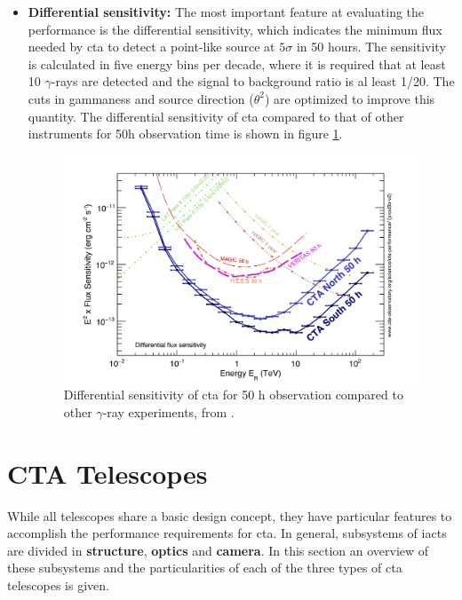 \documentclass[main.tex]{subfiles}
\begin{document}
\begin{itemize}
\item \textbf{Differential sensitivity:} The most important feature at evaluating the performance is the differential sensitivity, which indicates the minimum flux needed by \gls{cta} to detect a point-like source at $5\sigma$ in 50 hours. The sensitivity is calculated in five energy bins per decade, where it is required that at least 10 $\gamma$-rays are detected and the signal to background ratio is al least 1/20. The cuts in gammaness and source direction ($\theta^2$) are optimized to improve this quantity. The differential sensitivity of \gls{cta} compared to that of other instruments for 50h observation time is shown in figure \ref{fig:ctaperformance}.\\

\begin{figure}[h]
    \centering
    \includegraphics[width=1\textwidth]{Pictures/CTA-Performance-prod3b-v2-Comparison-DifferentialSensitivity-OtherInstruments.pdf}
    \caption{Differential sensitivity of \gls{cta} for 50 h observation compared to other $\gamma$-ray experiments, from \cite{CTAPerformance}.}
    \label{fig:ctaperformance}
\end{figure}
  
\end{itemize}

\section{CTA Telescopes} \label{sec:ctatelescopes}

While all telescopes share a basic design concept, they have particular features to accomplish the performance requirements for \gls{cta}. In general, subsystems of \glspl{iact} are divided in \textbf{structure}, \textbf{optics} and \textbf{camera}. 
In this section an overview of these subsystems and the particularities of each of the three types of \gls{cta} telescopes is given. 
\end{document}
